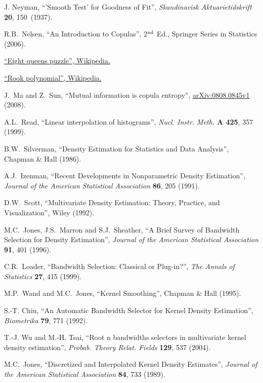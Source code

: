 \documentclass[12pt,titlepage]{article}
\newcommand{\supers}[1]{\ensuremath{^{\mbox{\scriptsize #1}}}}
\begin{document}
\begin{thebibliography}{99}
J. Neyman, ``'Smooth Test' for Goodness of Fit'', {\it Skandinavisk Aktuarietidskrift} {\bf 20}, 150~(1937).

R.B.~Nelsen, ``An Introduction to Copulas'', 2\supers{nd} Ed.,
Springer Series in Statistics (2006).

\href{http://en.wikipedia.org/wiki/Eight_queens_puzzle}{``Eight queens puzzle'', Wikipedia.}

\href{http://en.wikipedia.org/wiki/Rook_polynomial}{``Rook polynomial'', Wikipedia.}

J.~Ma and Z.~Sun, ``Mutual information is copula entropy'', 
\href{http://arxiv.org/abs/0808.0845}{arXiv:0808.0845v1} (2008).

A.L.~Read, ``Linear interpolation of histograms'',
 {\it Nucl. Instr. Meth.} {\bf A 425}, 357  (1999).

 B.W.~Silverman, ``Density Estimation for Statistics
and Data Analysis'', Chapman \& Hall (1986).

 A.J.~Izenman, ``Recent Developments in Nonparametric Density Estimation'', {\it Journal of the American Statistical Association} {\bf 86}, 205 (1991).

 D.W.~Scott,
``Multivariate Density Estimation: Theory, Practice, and Visualization'',
Wiley (1992).

 M.C.~Jones, J.S.~Marron and S.J.~Sheather,
``A Brief Survey of Bandwidth Selection for Density Estimation'',
{\it Journal of the American Statistical Association} {\bf 91}, 401 (1996).

 C.R.~Loader,
``Bandwidth Selection: Classical or Plug-in?'',
{\it The Annals of Statistics} {\bf 27}, 415 (1999).

 M.P.~Wand and M.C.~Jones,
``Kernel Smoothing'', Chapman \& Hall (1995).

 S.-T. Chiu,
``An Automatic Bandwidth Selector for Kernel Density Estimation'',
{\it Biometrika} {\bf 79}, 771 (1992).

 T.-J. Wu and M.-H. Tsai,
``Root n bandwidths selectors in multivariate kernel density estimation'',
{\it Probab. Theory Relat. Fields} {\bf 129}, 537 (2004).

 M.C.~Jones,
``Discretized and Interpolated Kernel Density Estimates'',
{\it Journal of the American Statistical Association} {\bf 84}, 733 (1989).


\end{thebibliography}
\end{document}
